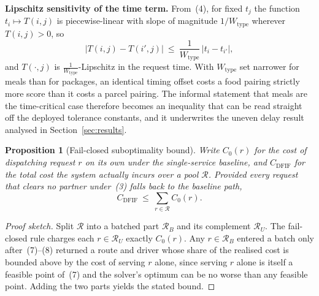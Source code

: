 \documentclass[conference]{IEEEtran}
\newtheorem{proposition}{Proposition}
\begin{document}
\textbf{Lipschitz sensitivity of the time term.} From~(4), for fixed $t_j$ the
function $t_i\mapsto T(i,j)$ is piecewise-linear with slope of magnitude
$1/W_{\text{type}}$ wherever $T(i,j)>0$, so
\begin{equation}
|T(i,j)-T(i',j)|\ \le\ \frac{1}{W_{\text{type}}}\,|t_i-t_{i'}|,
\end{equation}
and $T(\cdot,j)$ is $\tfrac{1}{W_{\text{type}}}$-Lipschitz in the request
time. With $W_{\text{type}}$ set narrower for meals than for packages, an
identical timing offset costs a food pairing strictly more score than it costs
a parcel pairing. The informal statement that meals are the time-critical case
therefore becomes an inequality that can be read straight off the deployed
tolerance constants, and it underwrites the uneven delay result analysed in
Section~\ref{sec:results}.

\begin{proposition}[Fail-closed suboptimality bound]
\label{prop:fc}
Write $C_0(r)$ for the cost of dispatching request $r$ on its own under the
single-service baseline, and $C_{\mathrm{DFIF}}$ for the total cost the system
actually incurs over a pool $\mathcal{R}$. Provided every request that clears
no partner under~(3) falls back to the baseline path,
\begin{equation}
C_{\mathrm{DFIF}}\ \le\ \sum_{r\in\mathcal{R}}C_0(r).
\end{equation}
\end{proposition}

\begin{proof}[Proof sketch]
Split $\mathcal{R}$ into a batched part $\mathcal{R}_B$ and its complement
$\mathcal{R}_U$. The fail-closed rule charges each $r\in\mathcal{R}_U$ exactly
$C_0(r)$. Any $r\in\mathcal{R}_B$ entered a batch only after~(7)--(8) returned
a route and driver whose share of the realised cost is bounded above by the
cost of serving $r$ alone, since serving $r$ alone is itself a feasible point
of~(7) and the solver's optimum can be no worse than any feasible point.
Adding the two parts yields the stated bound.
\end{proof}
\end{document}
